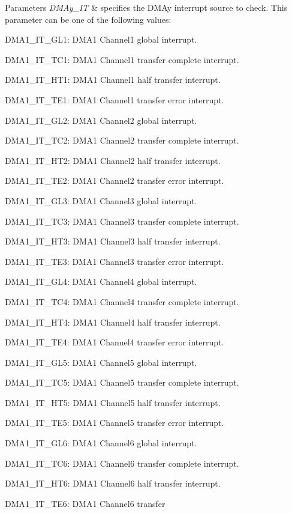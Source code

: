 \begin{DoxyParams}{Parameters}
{\em D\+M\+Ay\+\_\+\+IT} & specifies the D\+M\+Ay interrupt source to check. This parameter can be one of the following values\+: \begin{DoxyItemize}
\item D\+M\+A1\+\_\+\+I\+T\+\_\+\+G\+L1\+: D\+M\+A1 Channel1 global interrupt. \item D\+M\+A1\+\_\+\+I\+T\+\_\+\+T\+C1\+: D\+M\+A1 Channel1 transfer complete interrupt. \item D\+M\+A1\+\_\+\+I\+T\+\_\+\+H\+T1\+: D\+M\+A1 Channel1 half transfer interrupt. \item D\+M\+A1\+\_\+\+I\+T\+\_\+\+T\+E1\+: D\+M\+A1 Channel1 transfer error interrupt. \item D\+M\+A1\+\_\+\+I\+T\+\_\+\+G\+L2\+: D\+M\+A1 Channel2 global interrupt. \item D\+M\+A1\+\_\+\+I\+T\+\_\+\+T\+C2\+: D\+M\+A1 Channel2 transfer complete interrupt. \item D\+M\+A1\+\_\+\+I\+T\+\_\+\+H\+T2\+: D\+M\+A1 Channel2 half transfer interrupt. \item D\+M\+A1\+\_\+\+I\+T\+\_\+\+T\+E2\+: D\+M\+A1 Channel2 transfer error interrupt. \item D\+M\+A1\+\_\+\+I\+T\+\_\+\+G\+L3\+: D\+M\+A1 Channel3 global interrupt. \item D\+M\+A1\+\_\+\+I\+T\+\_\+\+T\+C3\+: D\+M\+A1 Channel3 transfer complete interrupt. \item D\+M\+A1\+\_\+\+I\+T\+\_\+\+H\+T3\+: D\+M\+A1 Channel3 half transfer interrupt. \item D\+M\+A1\+\_\+\+I\+T\+\_\+\+T\+E3\+: D\+M\+A1 Channel3 transfer error interrupt. \item D\+M\+A1\+\_\+\+I\+T\+\_\+\+G\+L4\+: D\+M\+A1 Channel4 global interrupt. \item D\+M\+A1\+\_\+\+I\+T\+\_\+\+T\+C4\+: D\+M\+A1 Channel4 transfer complete interrupt. \item D\+M\+A1\+\_\+\+I\+T\+\_\+\+H\+T4\+: D\+M\+A1 Channel4 half transfer interrupt. \item D\+M\+A1\+\_\+\+I\+T\+\_\+\+T\+E4\+: D\+M\+A1 Channel4 transfer error interrupt. \item D\+M\+A1\+\_\+\+I\+T\+\_\+\+G\+L5\+: D\+M\+A1 Channel5 global interrupt. \item D\+M\+A1\+\_\+\+I\+T\+\_\+\+T\+C5\+: D\+M\+A1 Channel5 transfer complete interrupt. \item D\+M\+A1\+\_\+\+I\+T\+\_\+\+H\+T5\+: D\+M\+A1 Channel5 half transfer interrupt. \item D\+M\+A1\+\_\+\+I\+T\+\_\+\+T\+E5\+: D\+M\+A1 Channel5 transfer error interrupt. \item D\+M\+A1\+\_\+\+I\+T\+\_\+\+G\+L6\+: D\+M\+A1 Channel6 global interrupt. \item D\+M\+A1\+\_\+\+I\+T\+\_\+\+T\+C6\+: D\+M\+A1 Channel6 transfer complete interrupt. \item D\+M\+A1\+\_\+\+I\+T\+\_\+\+H\+T6\+: D\+M\+A1 Channel6 half transfer interrupt. \item D\+M\+A1\+\_\+\+I\+T\+\_\+\+T\+E6\+: D\+M\+A1 Channel6 transfer 
\end{DoxyItemize}
\end{DoxyParams}
